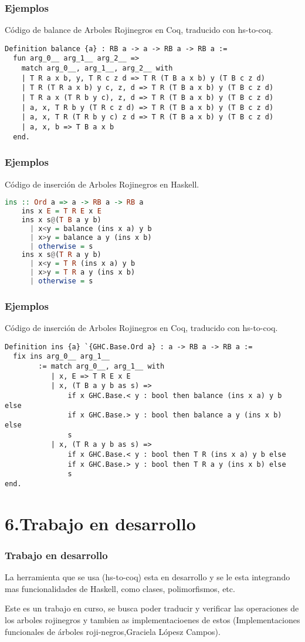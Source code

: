 \documentclass[xcolor=dvipsnames,table,handout]{beamer}
\begin{document}
\begin{frame}[fragile]
  \frametitle{Ejemplos}
  Código de balance de Arboles Rojinegros en Coq, traducido con hs-to-coq.
       \begin{lstlisting}[language=Coq]
 Definition balance {a} : RB a -> a -> RB a -> RB a :=
  fun arg_0__ arg_1__ arg_2__ =>
    match arg_0__, arg_1__, arg_2__ with
    | T R a x b, y, T R c z d => T R (T B a x b) y (T B c z d)
    | T R (T R a x b) y c, z, d => T R (T B a x b) y (T B c z d)
    | T R a x (T R b y c), z, d => T R (T B a x b) y (T B c z d)
    | a, x, T R b y (T R c z d) => T R (T B a x b) y (T B c z d)
    | a, x, T R (T R b y c) z d => T R (T B a x b) y (T B c z d)
    | a, x, b => T B a x b
  end.
       \end{lstlisting}
\end{frame}


\begin{frame}[fragile]
  \frametitle{Ejemplos}
  Código de inserción de Arboles Rojinegros en Haskell.
       \begin{lstlisting}[language=haskell]
    ins :: Ord a => a -> RB a -> RB a
    ins x E = T R E x E
    ins x s@(T B a y b)
      | x<y = balance (ins x a) y b
      | x>y = balance a y (ins x b)
      | otherwise = s
    ins x s@(T R a y b)
      | x<y = T R (ins x a) y b
      | x>y = T R a y (ins x b)
      | otherwise = s
       \end{lstlisting}
\end{frame}

\begin{frame}[fragile]
  \frametitle{Ejemplos}
  Código de inserción de Arboles Rojinegros en Coq, traducido con hs-to-coq.
       \begin{lstlisting}[language=Coq]
Definition ins {a} `{GHC.Base.Ord a} : a -> RB a -> RB a :=
  fix ins arg_0__ arg_1__
        := match arg_0__, arg_1__ with
           | x, E => T R E x E
           | x, (T B a y b as s) =>
               if x GHC.Base.< y : bool then balance (ins x a) y b else
               if x GHC.Base.> y : bool then balance a y (ins x b) else
               s
           | x, (T R a y b as s) =>
               if x GHC.Base.< y : bool then T R (ins x a) y b else
               if x GHC.Base.> y : bool then T R a y (ins x b) else
               s
end.
       \end{lstlisting}
\end{frame}

\section{6.Trabajo en desarrollo}
\begin{frame}
  \frametitle{Trabajo en desarrollo}
  La herramienta que se usa (hs-to-coq) esta en desarrollo y se le esta integrando mas funcionalidades de Haskell, como clases, polimorfismos, etc.

  Este es un trabajo en curso, se busca poder traducir y verificar las operaciones de los arboles rojinegros y tambien as implementacioenes de estos (Implementaciones funcionales de árboles roji-negros,Graciela Lópesz Campos).
\end{frame}
\end{document}
